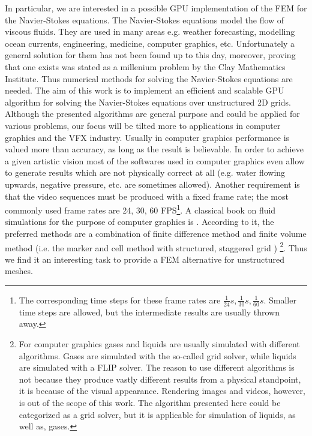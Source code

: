 In particular, we are interested in a possible GPU implementation of the FEM for the Navier-Stokes equations. The Navier-Stokes equations model the flow of viscous fluids. They are used in many areas e.g. weather forecasting, modelling ocean currents, engineering, medicine, computer graphics, etc. Unfortunately a general solution for them has not been found up to this day, moreover, proving that one exists was stated as a millenium problem by the Clay Mathematics Institute. Thus numerical methods for solving the Navier-Stokes equations are needed. The aim of this work is to implement an efficient and scalable GPU algorithm for solving the Navier-Stokes equations over unstructured 2D grids. Although the presented algorithms are general purpose and could be applied for various problems, our focus will be tilted more to applications in computer graphics and the VFX industry. Usually in computer graphics performance is valued more than accuracy, as long as the result is believable. In order to achieve a given artistic vision most of the softwares used in computer graphics even allow to generate results which are not physically correct at all (e.g. water flowing upwards, negative pressure, etc. are sometimes allowed). Another requirement is that the video sequences must be produced with a fixed frame rate; the most commonly used frame rates are 24, 30, 60 FPS\footnote{The corresponding time steps for these frame rates are $\frac{1}{24}s, \frac{1}{30}s, \frac{1}{60}s$. Smaller time steps are allowed, but the intermediate results are usually thrown away.}. A classical book on fluid simulations for the purpose of computer graphics is \cite{Bridson}. According to it, the preferred methods are a combination of finite difference method and finite volume method (i.e. the marker and cell method with structured, staggered grid \cite{MAC-Grid-Original}) \footnote{For computer graphics gases and liquids are usually simulated with different algorithms. Gases are simulated with the so-called grid solver, while liquids are simulated with a FLIP solver. The reason to use different algorithms is not because they produce vastly different results from a physical standpoint, it is because of the visual appearance. Rendering images and videos, however, is out of the scope of this work. The algorithm presented here could be categorized as a grid solver, but it is applicable for simulation of liquids, as well as, gases.}. Thus we find it an interesting task to provide a FEM alternative for unstructured meshes.

